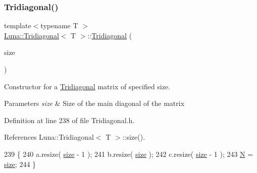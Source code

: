\subsubsection{\texorpdfstring{Tridiagonal()}{Tridiagonal()}\hspace{0.1cm}{\footnotesize\ttfamily [2/4]}}
{\footnotesize\ttfamily template$<$typename T $>$ \\
\hyperlink{classLuna_1_1Tridiagonal}{Luna\+::\+Tridiagonal}$<$ T $>$\+::\hyperlink{classLuna_1_1Tridiagonal}{Tridiagonal} (\begin{DoxyParamCaption}\item[{const std\+::size\+\_\+t \&}]{size }\end{DoxyParamCaption})\hspace{0.3cm}{\ttfamily [inline]}}



Constructor for a \hyperlink{classLuna_1_1Tridiagonal}{Tridiagonal} matrix of specified size. 


\begin{DoxyParams}{Parameters}
{\em size} & Size of the main diagonal of the matrix \\
\hline
\end{DoxyParams}


Definition at line 238 of file Tridiagonal.\+h.



References Luna\+::\+Tridiagonal$<$ T $>$\+::size().


\begin{DoxyCode}
239   \{
240     a.resize( \hyperlink{classLuna_1_1Tridiagonal_ae8586e82968a8c28f7c50008e1f75411}{size} - 1 );
241     b.resize( \hyperlink{classLuna_1_1Tridiagonal_ae8586e82968a8c28f7c50008e1f75411}{size} );
242     c.resize( \hyperlink{classLuna_1_1Tridiagonal_ae8586e82968a8c28f7c50008e1f75411}{size} - 1 );
243     \hyperlink{namespaceHeat__plot_a7d050092798e28458a263710837bda77}{N} = \hyperlink{classLuna_1_1Tridiagonal_ae8586e82968a8c28f7c50008e1f75411}{size};
244   \}
\end{DoxyCode}
\mbox{\label{classLuna_1_1Tridiagonal_ab723eb17bd32e82fb6e27e2170b4cccc}} 
